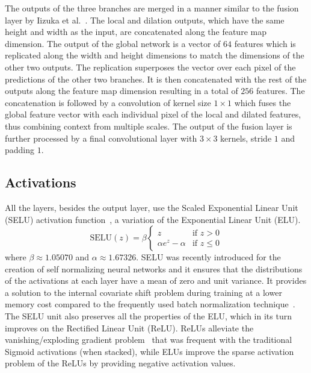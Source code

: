 \documentclass{egpubl}
\begin{document}
The outputs of the three branches are merged in a manner similar to the fusion
layer by Iizuka et al.~\cite{iizuka2016colornet}. The local and dilation outputs, which have
the same height and width as the input, are concatenated along the feature map
dimension. The output of the global network is a vector of $64$ features which
is replicated along the width and height dimensions to match the dimensions of
the other two outputs. The replication superposes the vector over each pixel of
the predictions of the other two branches. It is then concatenated with the
rest of the outputs along the feature map dimension resulting in a total of
$256$ features. The concatenation is followed by a convolution of kernel size
$1\times 1$ which fuses the global feature vector with each individual pixel of
the local and dilated features, thus combining context from multiple scales.
The output of the fusion layer is further processed by a final convolutional
layer with $3\times3$ kernels, stride $1$ and padding $1$.

\subsection{\textbf{Activations}}

All the layers, besides the output layer, use the Scaled Exponential Linear
Unit (SELU) activation function~\cite{klambauer2017selu}, a variation of the
Exponential Linear Unit (ELU).
\begin{equation}
    \text{SELU}(z) = \beta \begin{cases}
        z &\text{if $z > 0$}\\
        \alpha e^z  - \alpha &\text{if $z \leq 0$}
        \end{cases}
\end{equation}
where $\beta \approx 1.05070$ and $\alpha \approx 1.67326$. SELU was recently introduced for the creation of self normalizing neural networks and it
ensures that the distributions of the activations at each layer have a mean of zero and unit variance. It provides a solution to the internal
covariate shift problem during training at a lower memory cost compared to the frequently used batch normalization
technique~\cite{ioffe2015batchnorm}. The SELU unit also preserves all the properties of the ELU, which in its turn improves on the Rectified Linear
Unit (ReLU). ReLUs alleviate the vanishing/exploding gradient problem~\cite{krizhevsky2017alexnet} that was frequent with the traditional Sigmoid
activations (when stacked), while ELUs improve the sparse activation problem of the ReLUs by providing negative activation values.
\end{document}
